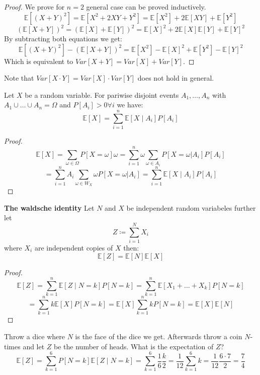 \begin{proof}
    We prove for $n = 2$ general case can be proved inductively.
    $$\mathbb{E}[(X+Y)^2] = \mathbb{E}[X^2 + 2XY + Y^2] = \mathbb{E}[X^2] + 2\mathbb{E}[XY] + \mathbb{E}[Y^2]$$
    $$(\mathbb{E}[X+Y])^2 = (\mathbb{E}[X] + \mathbb{E}[Y])^2 = \mathbb{E}[X]^2 + 2\mathbb{E}[X]\mathbb{E}[Y] + \mathbb{E}[Y]^2$$
    By subtracting both equations we get:
    $$\mathbb{E}[(X+Y)^2] - (\mathbb{E}[X+Y])^2 = \mathbb{E}[X^2] - \mathbb{E}[X]^2 + \mathbb{E}[Y^2] - \mathbb{E}[Y]^2$$
    Which is equivalent to $Var[X+Y] = Var[X] + Var[Y]$.
\end{proof}

\begin{important}
    Note that $Var[X \cdot Y] = Var[X] \cdot Var[Y]$ does not hold in general.
\end{important}

\begin{theorem}
    Let $X$ be a random variable. For pariwise disjoint events $A_1, \dots, A_n$ with $A_1 \cup \dots \cup A_n = \Omega$  and $P[A_i] > 0 \forall i$ we have:
    $$\mathbb{E}[X] = \sum_{i=1}^n \mathbb{E}[X \mid A_i] P[A_i]$$
\end{theorem}

\begin{proof}
    $$\mathbb{E}[X] = \sum_{\omega \in \Omega} P[X=\omega] \omega = \sum_{i=1}^n \omega \sum_{\omega \in A_i} P[X=\omega | A_i] P[A_i]$$
    $$ = \sum_{i=1}^n A_i \sum_{\omega \in W_X } \omega P[X=\omega | A_i] = \sum_{i=1}^n \mathbb{E}[X \mid A_i] P[A_i]$$
\end{proof}

\begin{theorem}
    \textbf{The waldsche identity}
    Let $N$ and $X$ be independent random variabeles further let
    $$Z \coloneqq \sum_{i=1}^N X_i$$
    where $X_i$ are independent copies of $X$ then:
    $$\mathbb{E}[Z] = \mathbb{E}[N] \mathbb{E}[X]$$
\end{theorem}

\begin{proof}
    $$\mathbb{E}[Z] = \sum_{k=1}^n \mathbb{E}[Z \mid N=k] P[N=k] = \sum_{k=1}^n \mathbb{E}[X_1 + \dots + X_k] P[N=k]$$
    $$= \sum_{k=1}^n k \mathbb{E}[X] P[N=k] = \mathbb{E}[X] \sum_{k=1}^n k P[N=k] = \mathbb{E}[X] \mathbb{E}[N]$$
\end{proof}

\begin{example}
    Throw a dice where $N$ is the face of the dice we get. Afterwards throw a coin $N$-times and let $Z$ be the number of heads. What is the expectation of $Z$?
    $$\mathbb{E}[Z] = \sum_{k=1}^6 P[N=k] \mathbb{E}[Z \mid N=k] = \sum_{k=1}^6 \frac{1}{6} \frac{k}{2} = \frac{1}{12} \sum_{k=1}^6 k = \frac{1}{12} \frac{6 \cdot 7}{2} = \frac{7}{4}$$
\end{example}

